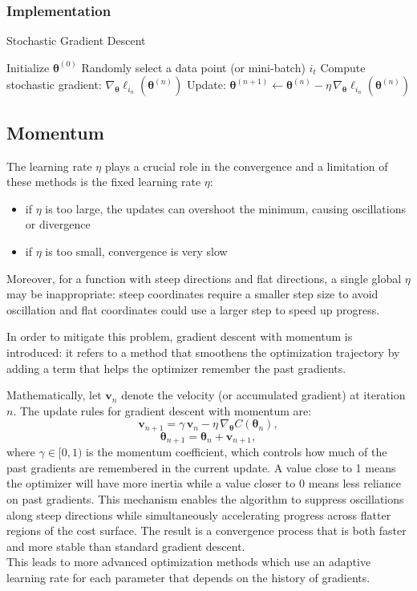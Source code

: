 \documentclass[%
 reprint,            %
 amsmath,amssymb,
 aps,
]{revtex4-2}
\begin{document}
\subsubsection{Implementation}
\begin{algorithm}[H]
\caption{Stochastic Gradient Descent}
\begin{algorithmic}[1]
\State Initialize $\boldsymbol{\theta}^{(0)}$
    \State Randomly select a data point (or mini-batch) $i_t$
    \State Compute stochastic gradient: $\nabla_{\boldsymbol{\theta}} \ell_{i_n}(\boldsymbol{\theta}^{(n)})$
    \State Update: $\boldsymbol{\theta}^{(n+1)} \gets \boldsymbol{\theta}^{(n)} - \eta \, \nabla_{\boldsymbol{\theta}} \ell_{i_n}(\boldsymbol{\theta}^{(n)})$
\EndFor
\end{algorithmic}
\end{algorithm}

\subsection{Momentum}
The learning rate $\eta$ plays a crucial role in the convergence and a limitation of these methods is the fixed learning rate ${\eta}$: 
\begin{itemize}
    \item if $\eta$ is too large, the updates can overshoot the minimum, causing oscillations or divergence
    \item if $\eta$ is too small, convergence is very slow
\end{itemize}
Moreover, for a function with steep directions and flat directions, a single global $ \eta$ may be inappropriate:
steep coordinates require a smaller step size to avoid oscillation and flat coordinates could use a larger step to speed up progress.

In order to mitigate this problem, gradient descent with momentum is introduced: it refers to a method that smoothens the optimization trajectory by adding a term that helps the optimizer remember the past gradients.

Mathematically, let $\boldsymbol{v}_n$ denote the velocity (or accumulated gradient) at iteration $n$. The update rules for gradient descent with momentum are:
$$
\boldsymbol{v}_{n+1} = \gamma \, \boldsymbol{v}_n - \eta \, \nabla_{\boldsymbol{\theta}} C(\boldsymbol{\theta}_n),
$$
$$
\boldsymbol{\theta}_{n+1} = \boldsymbol{\theta}_n + \boldsymbol{v}_{n+1},
$$
where $\gamma \in [0,1)$ is the momentum coefficient, which controls how much of the past gradients are remembered in the current update. A value close to 1 means the optimizer will have more inertia while a value closer to 0 means less reliance on past gradients. This mechanism enables the algorithm to suppress oscillations along steep directions while simultaneously accelerating progress across flatter regions of the cost surface. The result is a convergence process that is both faster and more stable than standard gradient descent.\\
This leads to more advanced optimization methods which use an adaptive learning rate for each parameter that depends on the history of gradients.\\
\end{document}
